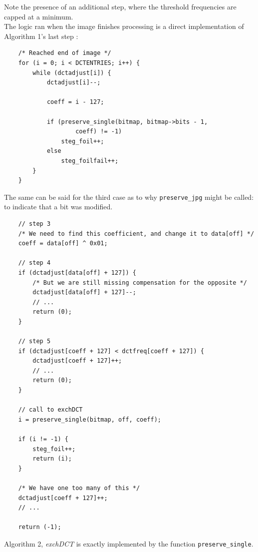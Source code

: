 \documentclass{article}
\begin{document}
Note the presence of an additional step, where the threshold frequencies are capped at a minimum. \\

The logic ran when the image finishes processing is a direct implementation of Algorithm 1's last step \cite{def01}:
\begin{verbatim}
	/* Reached end of image */
	for (i = 0; i < DCTENTRIES; i++) {
		while (dctadjust[i]) {
			dctadjust[i]--;
		
			coeff = i - 127;
		
			if (preserve_single(bitmap, bitmap->bits - 1,
					coeff) != -1)
				steg_foil++;
			else
				steg_foilfail++;
		}
	}
\end{verbatim}

The same can be said for the third case as to why \texttt{preserve\_jpg} might be called: to indicate that a bit was modified.
\begin{verbatim}
	// step 3
	/* We need to find this coefficient, and change it to data[off] */
	coeff = data[off] ^ 0x01;

	// step 4
	if (dctadjust[data[off] + 127]) {
		/* But we are still missing compensation for the opposite */
		dctadjust[data[off] + 127]--;
		// ...
		return (0);
	}
	
	// step 5
	if (dctadjust[coeff + 127] < dctfreq[coeff + 127]) {
		dctadjust[coeff + 127]++;
		// ...
		return (0);
	}
	
	// call to exchDCT
	i = preserve_single(bitmap, off, coeff);
	
	if (i != -1) {
		steg_foil++;
		return (i);
	}
	
	/* We have one too many of this */
	dctadjust[coeff + 127]++;
	// ...
	
	return (-1);
\end{verbatim}

Algorithm 2, \textit{exchDCT} is exactly implemented by the function \texttt{preserve\_single}.



\end{document}
